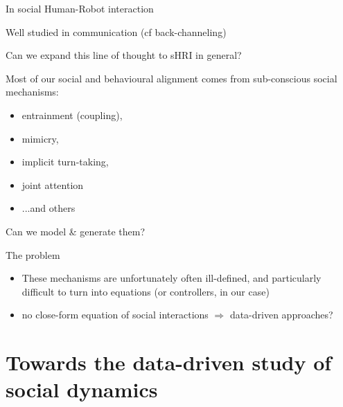 \documentclass[compress]{beamer}
\begin{document}
\begin{frame}{In social Human-Robot interaction}
    
    Well studied in communication (cf back-channeling)

    Can we expand this line of thought to sHRI in general?

    Most of our social and behavioural alignment comes from sub-conscious social
    mechanisms:

    \begin{itemize}
        \item entrainment (coupling), 
        \item mimicry, 
        \item implicit turn-taking,
        \item joint attention
        \item ...and others
    \end{itemize}
    \pause
    \begin{center}
    Can we model \& generate them?
    \end{center}
\end{frame}

\begin{frame}{The problem}
    \begin{itemize}
        \item These mechanisms are unfortunately often ill-defined, and
            particularly difficult to turn into equations (or controllers, in
            our case)
        \item no close-form equation of social interactions $\Rightarrow$ data-driven approaches?
    \end{itemize}
\end{frame}

\section[Data-driven!]{Towards the data-driven study of social dynamics}
\end{document}
